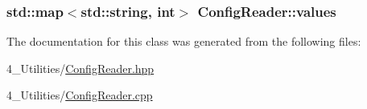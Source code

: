 \subsubsection[{\texorpdfstring{values}{values}}]{\setlength{\rightskip}{0pt plus 5cm}std\+::map$<$std\+::string, int$>$ Config\+Reader\+::values\hspace{0.3cm}{\ttfamily [protected]}}\hypertarget{class_config_reader_ad7bd3a0ec9513b9f385a658752c87b37}{}\label{class_config_reader_ad7bd3a0ec9513b9f385a658752c87b37}


The documentation for this class was generated from the following files\+:\begin{DoxyCompactItemize}
\item 
4\+\_\+\+Utilities/\hyperlink{_config_reader_8hpp}{Config\+Reader.\+hpp}\item 
4\+\_\+\+Utilities/\hyperlink{_config_reader_8cpp}{Config\+Reader.\+cpp}\end{DoxyCompactItemize}

